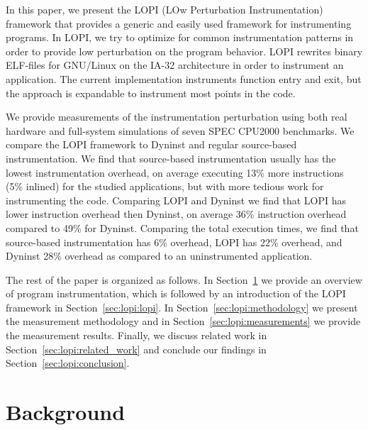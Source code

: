 In this paper, we present the LOPI (LOw Perturbation Instrumentation)
framework that provides a generic and easily used framework for instrumenting
programs. In LOPI, we try to optimize for common instrumentation patterns in
order to provide low perturbation on the program behavior. LOPI rewrites
binary ELF-files for GNU/Linux on the IA-32 architecture in order to
instrument an application.  The current implementation instruments function
entry and exit, but the approach is expandable to instrument most points in
the code.

We provide measurements of the instrumentation perturbation using both real
hardware and full-system simulations of seven SPEC CPU2000 benchmarks.  We
compare the LOPI framework to Dyninst\cite{buck00dyninst} and regular
source-based instrumentation.  We find that source-based instrumentation
usually has the lowest instrumentation overhead, on average executing 13\%
more instructions (5\% inlined) for the studied applications, but with more
tedious work for instrumenting the code.  Comparing LOPI and Dyninst we find
that LOPI has lower instruction overhead then Dyninst, on average 36\%
instruction overhead compared to 49\% for Dyninst.  Comparing the total
execution times, we find that source-based instrumentation has 6\% overhead,
LOPI has 22\% overhead, and Dyninst 28\% overhead as compared to an
uninstrumented application.



The rest of the paper is organized as follows. In Section~\ref{sec:lopi:background}
we provide an overview of program instrumentation, which is followed by an
introduction of the LOPI framework in Section~\ref{sec:lopi:lopi}. In
Section~\ref{sec:lopi:methodology} we present the measurement methodology and in
Section~\ref{sec:lopi:measurements} we provide the measurement results.  Finally,
we discuss related work in Section~\ref{sec:lopi:related_work} and conclude our
findings in Section~\ref{sec:lopi:conclusion}.

\section{Background}
\label{sec:lopi:background}


